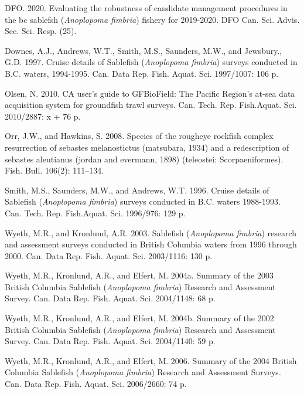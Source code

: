 \documentclass[12pt]{article}\usepackage[]{graphicx}\usepackage[]{color}
\begin{document}
\leavevmode\hypertarget{ref-dfo2020}{}%
DFO. 2020. Evaluating the robustness of candidate management procedures in the bc sablefsh (\emph{Anoplopoma fimbria}) fishery for 2019-2020. DFO Can. Sci. Advis. Sec. Sci. Resp. (25).

\leavevmode\hypertarget{ref-Downes1997}{}%
Downes, A.J., Andrews, W.T., Smith, M.S., Saunders, M.W., and Jewsbury., G.D. 1997. Cruise details of Sablefish (\emph{Anoplopoma fimbria}) surveys conducted in B.C. waters, 1994-1995. Can. Data Rep. Fish. Aquat. Sci. 1997/1007: 106 p.

\leavevmode\hypertarget{ref-Olsen2010}{}%
Olsen, N. 2010. CA user's guide to GFBioField: The Pacific Region's at-sea data acquisition system for groundfish trawl surveys. Can. Tech. Rep. Fish.Aquat. Sci. 2010/2887: x + 76 p.

\leavevmode\hypertarget{ref-Orr2008}{}%
Orr, J.W., and Hawkins, S. 2008. Species of the rougheye rockfish complex resurrection of sebastes melanostictus (matsubara, 1934) and a redescription of sebastes aleutianus (jordan and evermann, 1898) (teleostei: Scorpaeniformes). Fish. Bull. 106(2): 111--134.

\leavevmode\hypertarget{ref-Smith1996}{}%
Smith, M.S., Saunders, M.W., and Andrews, W.T. 1996. Cruise details of Sablefish (\emph{Anoplopoma fimbria}) surveys conducted in B.C. waters 1988-1993. Can. Tech. Rep. Fish.Aquat. Sci. 1996/976: 129 p.

\leavevmode\hypertarget{ref-Wyeth2003}{}%
Wyeth, M.R., and Kronlund, A.R. 2003. Sablefish (\emph{Anoplopoma fimbria}) research and assessment surveys conducted in British Columbia waters from 1996 through 2000. Can. Data Rep. Fish. Aquat. Sci. 2003/1116: 130 p.

\leavevmode\hypertarget{ref-Wyeth2004b}{}%
Wyeth, M.R., Kronlund, A.R., and Elfert, M. 2004a. Summary of the 2003 British Columbia Sablefish (\emph{Anoplopoma fimbria}) Research and Assessment Survey. Can. Data Rep. Fish. Aquat. Sci. 2004/1148: 68 p.

\leavevmode\hypertarget{ref-Wyeth2004a}{}%
Wyeth, M.R., Kronlund, A.R., and Elfert, M. 2004b. Summary of the 2002 British Columbia Sablefish (\emph{Anoplopoma fimbria}) Research and Assessment Survey. Can. Data Rep. Fish. Aquat. Sci. 2004/1140: 59 p.

\leavevmode\hypertarget{ref-Wyeth2006}{}%
Wyeth, M.R., Kronlund, A.R., and Elfert, M. 2006. Summary of the 2004 British Columbia Sablefish (\emph{Anoplopoma fimbria}) Research and Assessment Surveys. Can. Data Rep. Fish. Aquat. Sci. 2006/2660: 74 p.
\end{document}
